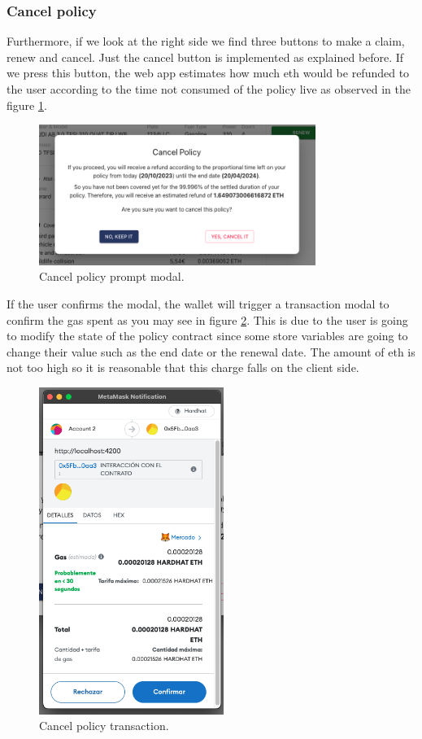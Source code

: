 \subsubsection{Cancel policy}
{
Furthermore, if we look at the right side we find three buttons to make a claim, renew and cancel. Just the cancel button is implemented as explained before. If we press this button, the web app estimates how much \acrshort{eth} would be refunded to the user according to the time not consumed of the policy live as observed in the figure \ref{fig:cancel-modal}.

\begin{figure}[H]
\centering
\includegraphics[width=9cm]{img/results/cancel-modal.png}
\caption[Insurechain: Cancel policy prompt modal]{\footnotesize{Cancel policy prompt modal.}}
\label{fig:cancel-modal}
\end{figure}

If the user confirms the modal, the wallet will trigger a transaction modal to confirm the gas spent as you may see in figure \ref{fig:cancel-transaction}. This is due to the user is going to modify the state of the policy contract since some store variables are going to change their value such as the end date or the renewal date. The amount of \acrshort{eth} is not too high so it is reasonable that this charge falls on the client side.

\begin{figure}[H]
\centering
\includegraphics[width=6cm]{img/results/cancel-transaction.png}
\caption[Insurechain: Cancel policy transaction]{\footnotesize{Cancel policy transaction.}}
\label{fig:cancel-transaction}
\end{figure}

}
